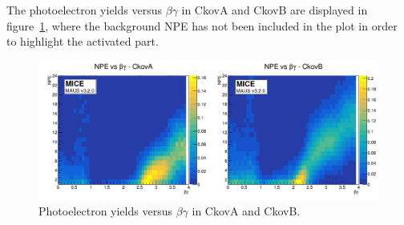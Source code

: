 The photoelectron yields versus $\beta\gamma$ in CkovA and CkovB are displayed in figure~\ref{fig:ckov_betagamma}, where the background NPE has not been included in the plot in order to highlight the activated part.






\begin{figure}[htb!]
  \begin{center}
    \includegraphics[width=0.90\columnwidth]{./03-Ckov/Figures/scatter_betagamma_logo.png}
    \caption{Photoelectron yields versus $\beta\gamma$ in CkovA and CkovB.}
    \label{fig:ckov_betagamma}
  \end{center}
\end{figure}

